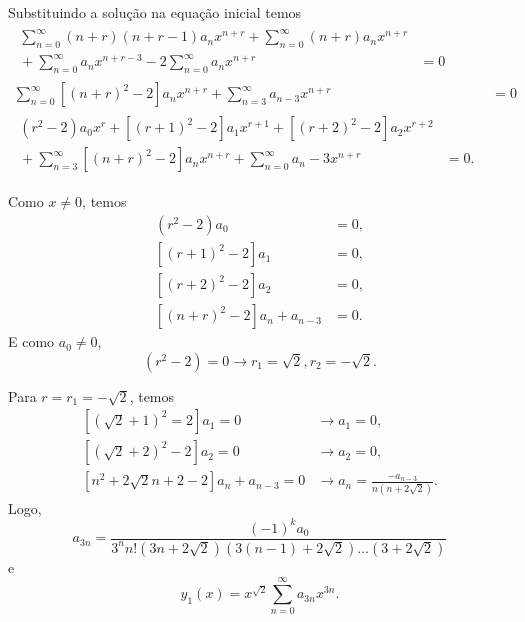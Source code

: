 \documentclass[a4paper,12pt, leqno, answers]{exam}
\begin{document}
\begin{questions}
\begin{solution}
        Substituindo a solu\c{c}\~{a}o na equa\c{c}\~{a}o inicial temos
        \begin{align*}
            \begin{split}
                \sum_{n = 0}^\infty \left( n + r \right) \left( n + r - 1 \right) a_n x^{n + r} + \sum_{n = 0}^\infty \left( n + r \right) a_n x^{n + r} \\ {}+ \sum_{n = 0}^\infty a_n x^{n + r - 3} - 2 \sum_{n = 0}^\infty a_n x^{n + r} &= 0
            \end{split} \\
            \sum_{n = 0}^\infty \left[ \left( n + r \right)^2 - 2 \right] a_n x^{n + r} + \sum_{n = 3}^\infty a_{n - 3} x^{n + r} &= 0 \\
            \begin{split}
                \left( r^2 - 2 \right) a_0 x^r + \left[ \left( r + 1 \right)^2 - 2 \right] a_1 x^{r + 1} + \left[ \left( r + 2 \right)^2 - 2 \right] a_2 x^{r + 2} \\ {}+ \sum_{n = 3}^\infty \left[ \left( n + r \right)^2 - 2 \right] a_n x^{n + r} + \sum_{n = 0}^\infty a_n - 3 x^{n + r} &= 0.
            \end{split}
        \end{align*}

        Como $x \neq 0$, temos
        \begin{align*}
            \left( r^2 - 2 \right) a_0 &= 0, \\
            \left[ \left( r + 1 \right)^2 - 2 \right] a_1 &= 0, \\
            \left[ \left( r + 2 \right)^2 - 2 \right] a_2 &= 0, \\
            \left[ \left( n + r \right)^2 - 2 \right] a_n + a_{n - 3} &= 0.
        \end{align*}
        E como $a_0 \neq 0$,
        \[
        \left( r^2 - 2 \right) = 0 \rightarrow r_1 = \sqrt{2}, r_2 = -\sqrt{2}.
        \]

        Para $r = r_1 = -\sqrt{2}$, temos
        \begin{align*}
            \left[ \left( \sqrt{2} + 1 \right)^2 = 2 \right] a_1 = 0 &\rightarrow a_1 = 0, \\
            \left[ \left( \sqrt{2} + 2 \right)^2 - 2 \right] a_2 = 0 &\rightarrow a_2 = 0, \\
            \left[ n^2 + 2\sqrt{2} n + 2 - 2 \right] a_n + a_{n - 3} = 0 &\rightarrow a_n = \frac{- a_{n - 3}}{n \left( n + 2 \sqrt{2} \right)}.
        \end{align*}
        Logo,
        \[
        a_{3n} = \frac{\left( -1 \right)^k a_0}{3^n n! \left( 3 n + 2\sqrt{2} \right) \left( 3 \left( n - 1 \right) + 2\sqrt{2} \right) \ldots \left( 3 + 2 \sqrt{2} \right)}
        \]
        e
        \[
        y_1(x) = x^{\sqrt{2}} \sum_{n = 0}^\infty a_{3n} x^{3n}.
        \]


\end{solution}
\end{questions}
\end{document}

